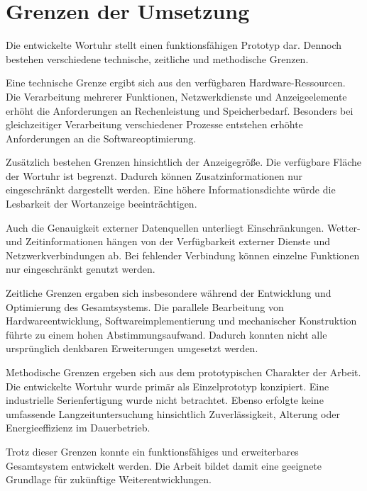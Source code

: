 \section{Grenzen der Umsetzung} 
Die entwickelte Wortuhr stellt einen funktionsfähigen Prototyp dar. 
Dennoch bestehen verschiedene technische, zeitliche und methodische Grenzen.

Eine technische Grenze ergibt sich aus den verfügbaren Hardware-Ressourcen. 
Die Verarbeitung mehrerer Funktionen, Netzwerkdienste und Anzeigeelemente erhöht die Anforderungen an Rechenleistung und Speicherbedarf. 
Besonders bei gleichzeitiger Verarbeitung verschiedener Prozesse entstehen erhöhte Anforderungen an die Softwareoptimierung.

Zusätzlich bestehen Grenzen hinsichtlich der Anzeigegröße. 
Die verfügbare Fläche der Wortuhr ist begrenzt. 
Dadurch können Zusatzinformationen nur eingeschränkt dargestellt werden. 
Eine höhere Informationsdichte würde die Lesbarkeit der Wortanzeige beeinträchtigen.

Auch die Genauigkeit externer Datenquellen unterliegt Einschränkungen. 
Wetter- und Zeitinformationen hängen von der Verfügbarkeit externer Dienste und Netzwerkverbindungen ab. 
Bei fehlender Verbindung können einzelne Funktionen nur eingeschränkt genutzt werden.

Zeitliche Grenzen ergaben sich insbesondere während der Entwicklung und Optimierung des Gesamtsystems. 
Die parallele Bearbeitung von Hardwareentwicklung, Softwareimplementierung und mechanischer Konstruktion führte zu einem hohen Abstimmungsaufwand. 
Dadurch konnten nicht alle ursprünglich denkbaren Erweiterungen umgesetzt werden.

Methodische Grenzen ergeben sich aus dem prototypischen Charakter der Arbeit. 
Die entwickelte Wortuhr wurde primär als Einzelprototyp konzipiert. 
Eine industrielle Serienfertigung wurde nicht betrachtet. 
Ebenso erfolgte keine umfassende Langzeituntersuchung hinsichtlich Zuverlässigkeit, Alterung oder Energieeffizienz im Dauerbetrieb.

Trotz dieser Grenzen konnte ein funktionsfähiges und erweiterbares Gesamtsystem entwickelt werden. 
Die Arbeit bildet damit eine geeignete Grundlage für zukünftige Weiterentwicklungen.